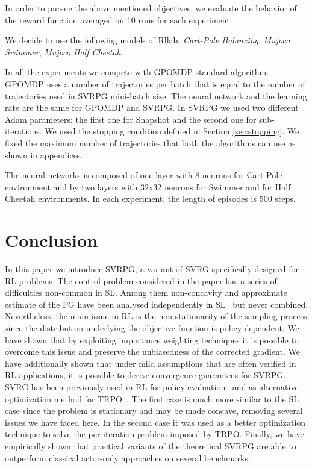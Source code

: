 \documentclass{article}
\makeatletter
\theoremstyle{remark}
\theoremstyle{definition}
\DeclareRobustCommand{\eg}{e.g.,\@\xspace}
\makeatother
\begin{document}
In order to pursue the above mentioned objectives, we evaluate the behavior of the reward function averaged on 10 runs for each experiment.

We decide to use the following models of Rllab: \emph{Cart-Pole Balancing}, \emph{Mujoco Swimmer}, \emph{Mujoco Half Cheetah}.


In all the experiments we compete with GPOMDP standard algorithm. GPOMDP uses a number of trajectories per batch that is equal to the number of trajectories used in SVRPG mini-batch size.
The neural network and the learning rate are the same for GPOMDP and SVRPG.
In SVRPG we used two different Adam parameters: the first one for Snapshot and the second one for sub-iterations.
We used the stopping condition defined in Section \ref{sec:stopping}.
We fixed the maximum number of trajectories that both the algorithms can use as shown in appendices. 

The neural networks is composed of one layer with 8 neurons for Cart-Pole environment and by two layers with 32x32 neurons for Swimmer and for Half Cheetah environments. In each experiment, the length of episodes is 500 steps.

\section{Conclusion}
In this paper we introduce SVRPG, a variant of SVRG specifically designed for RL problems.
The control problem considered in the paper has a series of difficulties non-common in SL.
Among them non-concavity and approximate estimate of the FG have been analysed independently in SL~\citep[\eg][]{allen2016variance,reddi2016stochastic,harikandeh2015stopwasting} but never combined.
Nevertheless, the main issue in RL is the non-stationarity of the sampling process since the distribution underlying the objective function is policy dependent.
We have shown that by exploiting importance weighting techniques it is possible to overcome this issue and preserve the unbiasedness of the corrected gradient.
We have additionally shown that under mild assumptions that are often verified in RL applications, it is possible to derive convergence guarantees for SVRPG.
SVRG has been previously used in RL for policy evaluation~\citep{du2017svrgpe} and as alternative optimization method for TRPO~\citep{xu2017svrgtrpo}.
The first case is much more similar to the SL case since the problem is stationary and may be made concave, removing several issues we have faced here.
In the second case it was used as a better optimization technique to solve the per-iteration problem imposed by TRPO.
Finally, we have empirically shown that practical variants of the theoretical SVRPG are able to outperform classical actor-only approaches on several benchmarks.
\end{document}
